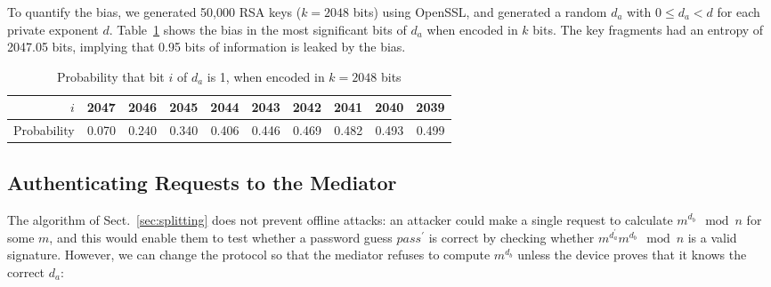 \documentclass{llncs}
\begin{document}
To quantify the bias, we generated 50,000 RSA keys ($k=2048$ bits) using OpenSSL, and generated a
random $d_a$ with $0 \le d_a < d$ for each private exponent $d$. Table~\ref{tab:bias} shows the bias
in the most significant bits of $d_a$ when encoded in $k$ bits. The key fragments had an entropy of
2047.05 bits, implying that 0.95 bits of information is leaked by the bias.

\renewcommand{\arraystretch}{1.5}
\setlength\tabcolsep{4pt}
\begin{table}
\centering
\caption{Probability that bit $i$ of $d_a$ is 1, when encoded in $k=2048$ bits}\label{tab:bias}
\begin{tabular}{r|rrrrrrrrr}
$i$ & 2047 & 2046 & 2045 & 2044 & 2043 & 2042 & 2041 & 2040 & 2039 \\ \hline
Probability &
0.070 & 0.240 & 0.340 & 0.406 & 0.446 & 0.469 & 0.482 & 0.493 & 0.499
\end{tabular}
\end{table}

\subsection{Authenticating Requests to the Mediator}\label{sec:mediator-auth}

The algorithm of Sect.~\ref{sec:splitting} does not prevent offline attacks: an attacker could make
a single request to calculate $m^{d_b} \mod n$ for some $m$, and this would enable them to test
whether a password guess $\mathit{pass}^\prime$ is correct by checking whether
$m^{d_a^\prime} m^{d_b} \mod n$ is a valid signature. However, we can change the protocol so that
the mediator refuses to compute $m^{d_b}$ unless the device proves that it knows the correct $d_a$:
\end{document}
